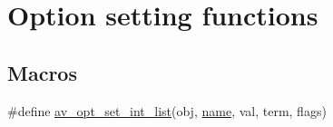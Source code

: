 \hypertarget{group__opt__set__funcs}{}\section{Option setting functions}
\label{group__opt__set__funcs}
\subsection*{Macros}
\begin{DoxyCompactItemize}
\item 
\#define \hyperlink{group__opt__set__funcs_gac06fc2b2e32f67f067ed7aaec163447f}{av\+\_\+opt\+\_\+set\+\_\+int\+\_\+list}(obj,  \hyperlink{lib_2expat_8h_a1b49b495b59f9e73205b69ad1a2965b0}{name},  val,  term,  flags)
\end{DoxyCompactItemize}
